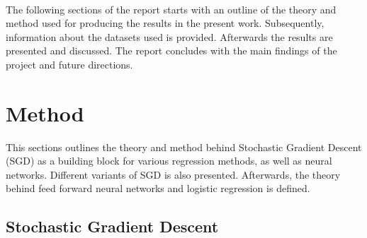 \documentclass[a4paper,twocolumn]{article}
\begin{document}
\\
The following sections of the report starts with an outline of the theory and method used for producing the results in the present work. Subsequently, information about the datasets used is provided. Afterwards the results are presented and discussed. The report concludes with the main findings of the project and future directions.
\section{Method}
This sections outlines the theory and method behind Stochastic Gradient Descent (SGD) as a building block for various regression methods, as well as neural networks. Different variants of SGD is also presented. Afterwards, the theory behind feed forward neural networks and logistic regression is defined.
\subsection{Stochastic Gradient Descent}
\end{document}
